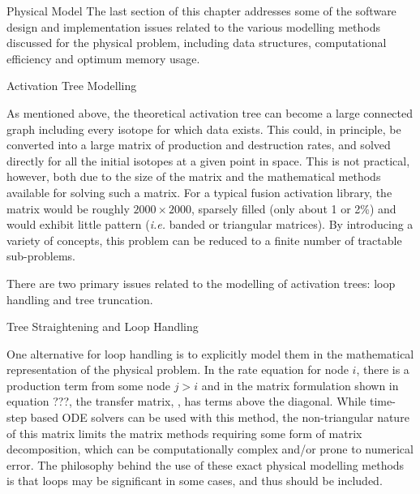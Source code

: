 \begin{chapter}{Physical Model\label{chap:physical}}
The last section of this chapter addresses some of the software design
and implementation issues related to the various modelling methods
discussed for the physical problem, including data structures,
computational efficiency and optimum memory usage.

\begin{section}{Activation Tree Modelling\label{sec:physical.chains}}
  
  As mentioned above, the theoretical activation tree can become a
  large connected graph including every isotope for which data exists.
  This could, in principle, be converted into a large matrix of
  production and destruction rates, and solved directly for all the
  initial isotopes at a given point in space.  This is not practical,
  however, both due to the size of the matrix and the mathematical
  methods available for solving such a matrix.  For a typical fusion
  activation library, the matrix would be roughly $2000 \times 2000$,
  sparsely filled (only about 1 or 2\%) and would exhibit little
  pattern (\textsl{i.e.} banded or triangular matrices).  By
  introducing a variety of concepts, this problem can be reduced to a
  finite number of tractable sub-problems.  
  
  There are two primary issues related to the modelling of activation
  trees: loop handling and tree truncation.
  
  \begin{subsection}{Tree Straightening and Loop Handling}
    
    \begin{floatingfigure}{0.55\columnwidth}
      \begin{center}
        \caption{Fully straightened and unlinked reaction
          tree.}\label{fig:physical.straight_tree}
      \end{center}
    \end{floatingfigure}

    One alternative for loop handling is to explicitly model them in
    the mathematical representation of the physical problem.  In the
    rate equation for node $i$, there is a production term from some
    node $j>i$ and in the matrix formulation shown in equation ???,
    the transfer matrix, , has terms above the diagonal.  While
    time-step based ODE solvers can be used with this method, the
    non-triangular nature of this matrix limits the matrix methods
    requiring some form of matrix decomposition, which can be
    computationally complex and/or prone to numerical error.  The
    philosophy behind the use of these exact physical modelling
    methods is that loops may be significant in some cases, and thus
    should be included.
    

\end{subsection}
\end{section}
\end{chapter}
